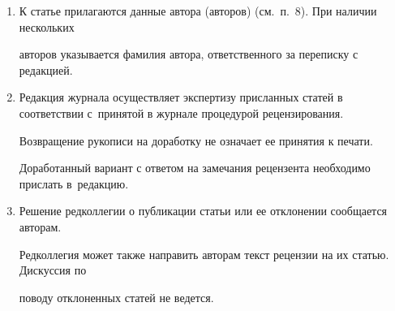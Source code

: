 {{\begin{enumerate}[1.]
Этот договор может быть пред\-став\-лен в~бумажном (в~2-х экз.)\ 


или в~электронном виде (отсканированная копия заполненного и~подписанного документа).








Редколлегия вправе запросить у авторов экспертное заключение о возможности


пуб\-ли\-ка\-ции представленной статьи в открытой печати.\\[-12pt]





\item К статье прилагаются данные автора (авторов) (см.\ п.~8). При наличии нескольких


авторов указывается фамилия автора, ответственного за переписку с редакцией.\\[-12pt]





\item Редакция журнала осуществляет экспертизу присланных статей в соответствии с~принятой в журнале процедурой рецензирования.





Возвращение рукописи на доработку не означает ее принятия к печати.





Доработанный вариант с ответом на замечания рецензента необходимо прислать в~редакцию.\\[-12pt]





\item Решение редколлегии о публикации статьи или ее отклонении сообщается авторам.





Редколлегия может также направить авторам текст рецензии на их статью. Дискуссия по


поводу отклоненных статей не ведется.\\[-14pt]











\end{enumerate}}}
